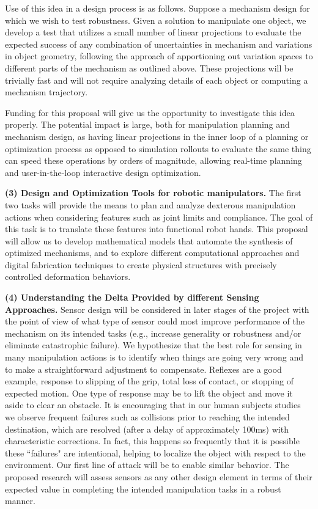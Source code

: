 Use of this idea in a design process is as follows.   Suppose a mechanism design for which we wish to test robustness.    Given a  solution to manipulate one object, we develop a test that utilizes a small number of linear projections to evaluate the expected success of any combination of uncertainties in mechanism and variations in object geometry, following the approach of apportioning out variation spaces to different parts of the mechanism as outlined above.   These projections will be trivially fast and will not require analyzing details of each object or computing a mechanism trajectory.

Funding for this proposal will give us the opportunity to investigate this idea properly.   The potential impact is large, both for manipulation planning and mechanism design, as having linear projections in the inner loop of a planning or optimization process as opposed to simulation rollouts to evaluate the same thing can speed these operations by orders of magnitude, allowing real-time planning and user-in-the-loop interactive design optimization.

\smallskip\noindent
{\bf (3) Design and Optimization Tools for robotic manipulators.} The first two tasks will provide the means to plan and analyze dexterous manipulation actions when considering features such as joint limits and compliance. The goal of this task is to translate these features into functional robot hands. This proposal will allow us to develop mathematical models that automate the synthesis of optimized mechanisms, and to explore different computational approaches and digital fabrication techniques to create physical structures with precisely controlled deformation behaviors.

 \smallskip\noindent
{\bf (4) Understanding the Delta Provided by different Sensing Approaches.}   Sensor design will be considered in later stages of the project with the point of view of what type of sensor could most improve performance of the mechanism on its intended tasks (e.g., increase generality or robustness and/or eliminate catastrophic failure).   We hypothesize that the best role for sensing in many manipulation actions is to identify when things are going very wrong and to make a straightforward adjustment to compensate.   Reflexes are a good example, response to slipping of the grip, total loss of contact, or stopping of expected motion.   One type of response may be to  lift the object and move it aside to clear an obstacle.     It is encouraging that in our human subjects studies we observe frequent failures such as collisions prior to reaching the intended destination, which are resolved (after a delay of approximately 100ms) with characteristic corrections.   In fact, this happens so frequently that it is possible these ``failures" are intentional, helping to localize the object with respect to the environment.  Our first line of attack will be to enable similar behavior.  The proposed research  will assess sensors as any other design element in terms of their expected value in completing the intended manipulation tasks in a robust manner.

     

